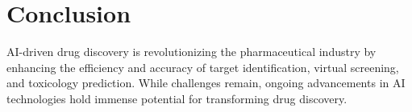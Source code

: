 \documentclass[12pt]{article}
\begin{document}
\section{Conclusion}
AI-driven drug discovery is revolutionizing the pharmaceutical industry by enhancing the efficiency and accuracy of target identification, virtual screening, and toxicology prediction. While challenges remain, ongoing advancements in AI technologies hold immense potential for transforming drug discovery.



\end{document}
